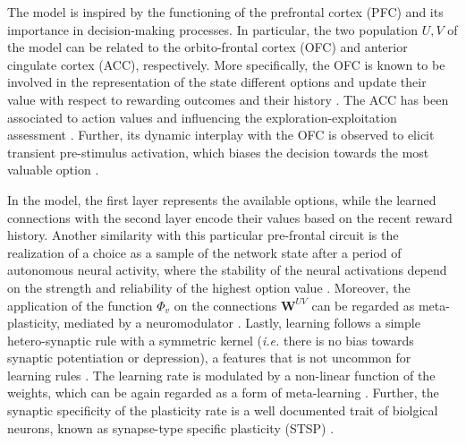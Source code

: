 The model is inspired by the functioning of the prefrontal cortex (PFC) and its importance in decision-making processes. In particular, the two population $U, V$ of the model can be related to the orbito-frontal cortex (OFC) and anterior cingulate cortex (ACC), respectively.
More specifically, the OFC is known to be involved in the representation of the state different options and update their value with respect to rewarding outcomes and their history \cite{lukChoiceCodingFrontal2013, kennerleyDecisionMakingReward2011a}.
The ACC has been associated to action values and influencing the exploration-exploitation assessment \cite{khamassiChapter22Medial2013}. Further, its dynamic interplay with the OFC is observed to elicit transient pre-stimulus activation, which biases the decision towards the most valuable option \cite{funahashiPrefrontalContributionDecisionMaking2017, marcosDeterminingMonkeyFree2016, balewskiValueDynamicsAffect2023}.

In the model, the first layer represents the available options, while the learned connections with the second layer encode their values based on the recent reward history.
Another similarity with this particular pre-frontal circuit is the realization of a choice as a sample of the network state after a period of autonomous neural activity, where the stability of the neural activations depend on the strength and reliability of the highest option value \cite{backmanEffectsWorkingMemoryTraining2011, enelStableDynamicRepresentations2020}.
Moreover, the application of the function $\Phi_{v}$ on the connections $\textbf{W}^{UV}$ can be regarded as meta-plasticity, mediated by a neuromodulator \cite{wangMetalearningNaturalArtificial2021}.
Lastly, learning follows a simple hetero-synaptic rule with a symmetric kernel (\textit{i.e.} there is no bias towards synaptic potentiation or depression), a features that is not uncommon for learning rules \cite{parkSymmetryLearningRate2017}.
The learning rate is modulated by a non-linear function of the weights, which can be again regarded as a form of meta-learning \cite{inglisModulationDopamineAdaptive2021, iigayaAdaptiveLearningDecisionmaking2016}.
Further, the synaptic specificity of the plasticity rate is a well documented trait of biolgical neurons, known as synapse-type specific plasticity (STSP) \cite{larsenSynapsetypespecificPlasticityLocal2015}.

